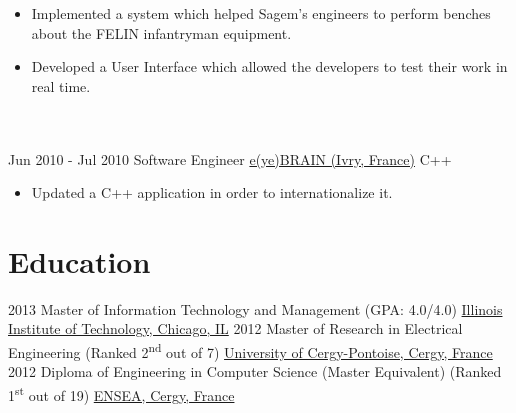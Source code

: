 \documentclass[letterpaper]{template} %
\begin{document}
\begin{twenty}
        {\begin{itemize}
            \item Implemented a system which helped Sagem’s engineers to perform benches about the FELIN infantryman equipment.
            \item Developed a User Interface which allowed the developers to test their work in real time.
        \end{itemize}}
    \\\divider\\
     \twentyitem
   		{Jun 2010 - Jul 2010}
		{}
        {Software Engineer}
        {\href{http://www.eyebrain.fr/}{e(ye)BRAIN (Ivry, France)}}
        {C++}
        {\begin{itemize}
            \item Updated a C++ application in order to internationalize it.
        \end{itemize}}
        
\end{twenty}

\section{Education}

\begin{twenty} %
	\twentyitem
    	{2013}
        {}
        {Master of Information Technology and Management \textnormal{(GPA: 4.0/4.0)}}
        {}
        {\href{https://web.iit.edu/}{Illinois Institute of Technology, Chicago, IL}}
        {}
	\twentyitem
    	{2012}
		{}
        {Master of Research in Electrical Engineering \textnormal{(Ranked 2\textsuperscript{nd} out of 7)}}
        {}
        {\href{https://www.u-cergy.fr/en/index.html}{University of Cergy-Pontoise, Cergy, France}}
        {}
    \twentyitem
    	{2012}
		{}
        {Diploma of Engineering in Computer Science (Master Equivalent) \textnormal{(Ranked 1\textsuperscript{st} out of 19)}}
        {}
        {\href{https://www.ensea.fr/en}{ENSEA, Cergy, France}}
        {}
\end{twenty}
\end{document}
